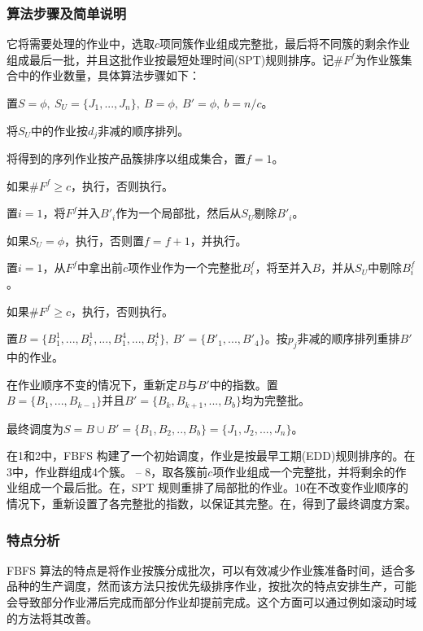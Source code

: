 \subsubsection{算法步骤及简单说明}
它将需要处理的作业中，选取$c$项同簇作业组成完整批，最后将不同簇的剩余作业组成最后一批，并且这批作业按最短处理时间(SPT)规则排序。记$\#F^f$为作业簇集合中的作业数量，具体算法步骤如下：
\begin{asparaenum}
\renewcommand{\labelenumi}{\heiti 步骤\theenumi~}
\item 置$S = \phi,\ S_U = \{J_1,...,J_n\},\ B = \phi,\ B' = \phi,\ b=n/c$。
\item 将$S_U$中的作业按$d_j$非减的顺序排列。
\item 将得到的序列作业按产品簇排序以组成集合，置$f=1$。
\item 如果$\# F^f \geqslant c$，执行，否则执行。
\item 置$i=1$，将$F^f\text{并入}B'_i$作为一个局部批，然后从$S_U\text{剔除}B'_i$。
\item 如果$S_U = \phi$，执行，否则置$f=f+1$，并执行。
\item 置$i=1$，从$F^f$中拿出前$c$项作业作为一个完整批$B^f_i$，将至并入$B$，并从$S_U\text{中剔除}B^f_i$。
\item 如果$\# F^f \geqslant c$，执行，否则执行。
\item 置$B = \{B_1^1,...,B_i^1,...,B_1^4,...,B_i^4\},\ B' = \{B'_1,...,B'_4\}$。按$p_j$非减的顺序排列重排$B'$中的作业。
\item 在作业顺序不变的情况下，重新定$B\text{与}B'$中的指数。置$B=\{B_1,...,B_{k-1}\}\text{并且}B' = \{B_k,B_{k+1},...,B_b\}$均为完整批。
\item 最终调度为$S=B\cup B' = \{B_1,B_2,..,B_b\} = \{J_1,J_2,...,J_n\}$。
\end{asparaenum}

在\Step1和\Step2中，FBFS 构建了一个初始调度，作业是按最早工期(EDD)规则排序的。在\Step3中，作业群组成4个簇。 -- 8，取各簇前$c$项作业组成一个完整批，并将剩余的作业组成一个最后批。在，SPT 规则重排了局部批的作业。\Step10在不改变作业顺序的情况下，重新设置了各完整批的指数，以保证其完整。在，得到了最终调度方案。

\subsubsection{特点分析}
FBFS 算法的特点是将作业按簇分成批次，可以有效减少作业簇准备时间，适合多品种的生产调度，然而该方法只按优先级排序作业，按批次的特点安排生产，可能会导致部分作业滞后完成而部分作业却提前完成。这个方面可以通过例如滚动时域的方法将其改善。
